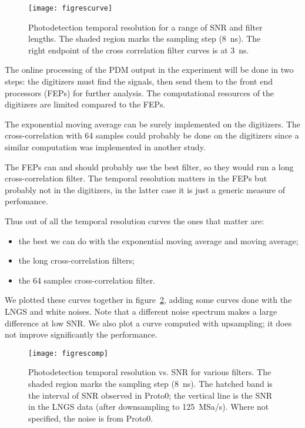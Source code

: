 \begin{figure}
    \hspace{-0.09\textwidth}
    \texttt{[image: figrescurve]}
    
    \caption{Photodetection temporal resolution for a range of SNR and filter
    lengths. The shaded region marks the sampling step (\SI{8}{ns}). The right
    endpoint of the cross correlation filter curves is at \SI{3}{ns}.}
    
    \label{fig:rescurve}
\end{figure}

The online processing of the PDM output in the experiment will be done in two
steps: the digitizers must find the signals, then send them to the front end
processors (FEPs) for further analysis. The computational resources of the
digitizers are limited compared to the FEPs.


The exponential moving average can be surely implemented on the digitizers. The
cross-correlation with 64 samples could probably be done on the digitizers
since a similar computation was implemented in another study.

The FEPs can and should probably use the best filter, so they would run a long
cross-correlation filter. The temporal resolution matters in the FEPs but
probably not in the digitizers, in the latter case it is just a generic measure
of perfomance.

Thus out of all the temporal resolution curves the ones that matter are:
%
\begin{itemize}
    \item the best we can do with the exponential moving average and moving
    average;
    \item the long cross-correlation filters;
    \item the 64 samples cross-correlation filter.
\end{itemize}
%
We plotted these curves together in figure~\ref{fig:rescomp}, adding some
curves done with the LNGS and white noises. Note that a different noise
spectrum makes a large difference at low SNR. We also plot a curve computed
with upsampling; it does not improve significantly the performance.

\begin{figure}
    \hspace{0.00\textwidth}
    \texttt{[image: figrescomp]}
    
    \caption{Photodetection temporal resolution vs. SNR for various filters.
    The shaded region marks the sampling step (\SI{8}{ns}). The hatched band is
    the interval of SNR observed in Proto0; the vertical line is the SNR in the
    LNGS data (after downsampling to \SI{125}{MSa/s}). Where not specified, the
    noise is from Proto0.}
    
    \label{fig:rescomp}
\end{figure}

